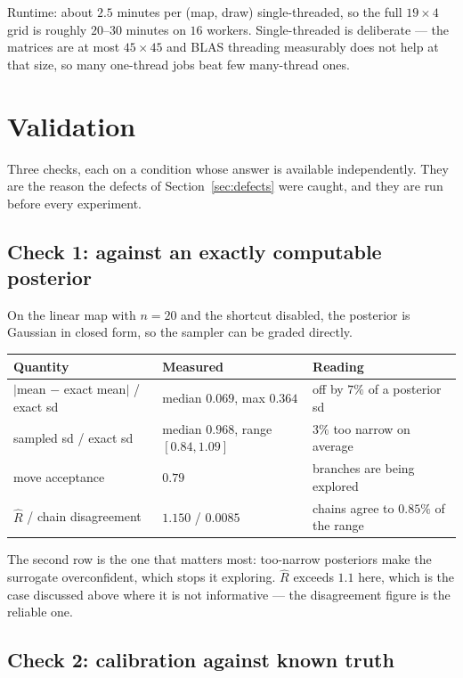 \documentclass[11pt]{article}
\begin{document}
Runtime: about $2.5$ minutes per (map, draw) single-threaded, so the full
$19\times4$ grid is roughly $20$--$30$ minutes on $16$ workers. Single-threaded
is deliberate --- the matrices are at most $45\times45$ and BLAS threading
measurably does not help at that size, so many one-thread jobs beat few
many-thread ones.

\section{Validation}
\label{sec:validation}

Three checks, each on a condition whose answer is available independently. They
are the reason the defects of Section~\ref{sec:defects} were caught, and they are
run before every experiment.

\subsection{Check 1: against an exactly computable posterior}

On the linear map with $n=20$ and the shortcut disabled, the posterior is
Gaussian in closed form, so the sampler can be graded directly.

\begin{center}
\begin{tabular}{lll}
\toprule
Quantity & Measured & Reading \\
\midrule
$|$mean $-$ exact mean$|$ / exact sd & median $0.069$, max $0.364$ & off by $7\%$ of a posterior sd \\
sampled sd / exact sd & median $0.968$, range $[0.84,1.09]$ & $3\%$ too narrow on average \\
move acceptance & $0.79$ & branches are being explored \\
$\hat R$ / chain disagreement & $1.150$ / $0.0085$ & chains agree to $0.85\%$ of the range \\
\bottomrule
\end{tabular}
\end{center}

The second row is the one that matters most: too-narrow posteriors make the
surrogate overconfident, which stops it exploring. $\hat R$ exceeds $1.1$ here,
which is the case discussed above where it is not informative --- the
disagreement figure is the reliable one.

\subsection{Check 2: calibration against known truth}
\end{document}
